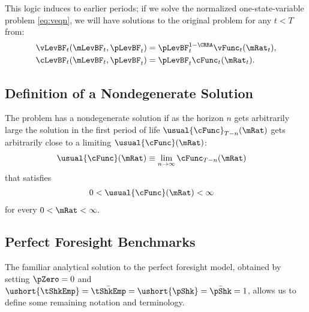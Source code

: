 \documentclass[BufferStockTheory]{subfiles}
\begin{document}
This logic induces to earlier periods; if we solve the
normalized one-state-variable problem \eqref{eq:veqn}, we
will have solutions to the original problem for any $t<T$
from:
\begin{align*}
  \vLevBF_{t}(\mLevBF_{t},\pLevBF_{t})  & = \pLevBF_{t}^{1-\CRRA}\vFunc_{t}(\mRat_{t}),
  \\ \cLevBF_{t}(\mLevBF_{t},\pLevBF_{t})  & = \pLevBF_{t}\cFunc_{t}(\mRat_{t}).
\end{align*}

\hypertarget{Definition-of-a-Nondegenerate-Solution}{}
\subsection{Definition of a Nondegenerate Solution}

The problem has a nondegenerate solution if as the horizon $n$ gets arbitrarily large the solution in the first period of life $\usual{\cFunc}_{T-n}(\mRat)$ gets arbitrarily close to a limiting $\usual{\cFunc}(\mRat)$:
\begin{align}
  \usual{\cFunc}(\mRat)  & \equiv  \lim_{n \rightarrow \infty} \cFunc_{T-n}(\mRat)
\end{align}
that satisfies
\begin{align}
  0 & < \usual{\cFunc}(\mRat) <  \infty 
\end{align}
for every $0 < \mRat < \infty.$%

\hypertarget{Perfect-Foresight-Benchmarks}{}
\subsection{Perfect Foresight Benchmarks}

The familiar analytical solution to the perfect foresight model, obtained by setting $\pZero=0$ and $\ushort{\tShkEmp}=\bar{\tShkEmp}=\ushort{\pShk}=\bar{\pShk}=1$, allows us to define some remaining notation and terminology.

\hypertarget{Human-Wealth}{}
\end{document}
